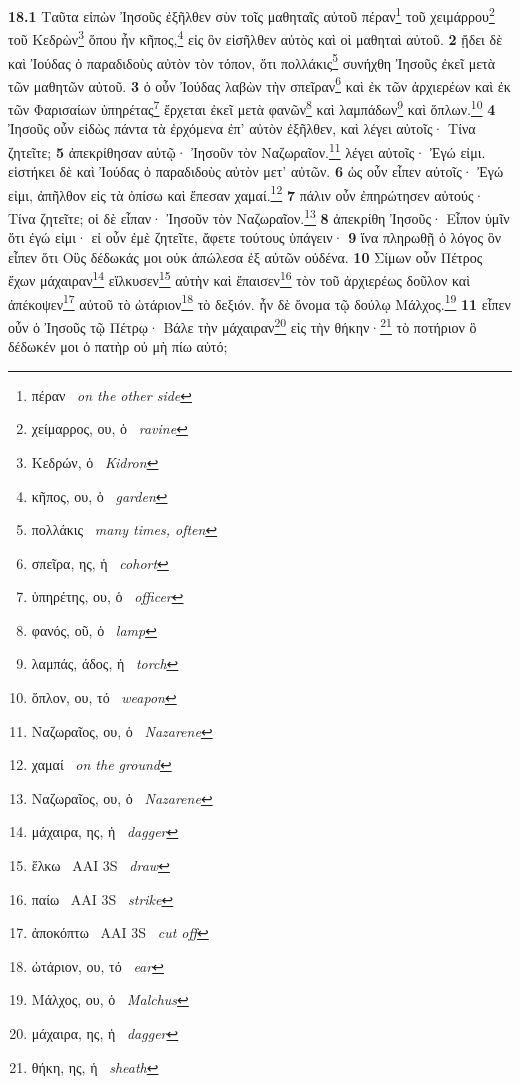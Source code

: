 \documentclass[a4paper,12pt]{article}
\begin{document}
\textbf{\Large 18.1}
Ταῦτα
εἰπὼν
Ἰησοῦς
ἐξῆλθεν
σὺν
τοῖς
μαθηταῖς
αὐτοῦ
πέραν\footnote{πέραν \textendash\ \textit{on the other side}}
τοῦ
χειμάρρου\footnote{χείμαρρος, ου, ὁ \textendash\ \textit{ravine}}
τοῦ
Κεδρὼν\footnote{Κεδρών, ὁ \textendash\ \textit{Kidron}}
ὅπου
ἦν
κῆπος,\footnote{κῆπος, ου, ὁ \textendash\ \textit{garden}}
εἰς
ὃν
εἰσῆλθεν
αὐτὸς
καὶ
οἱ
μαθηταὶ
αὐτοῦ.
\textbf{2}
ᾔδει
δὲ
καὶ
Ἰούδας
ὁ
παραδιδοὺς
αὐτὸν
τὸν
τόπον,
ὅτι
πολλάκις\footnote{πολλάκις \textendash\ \textit{many times, often}}
συνήχθη
Ἰησοῦς
ἐκεῖ
μετὰ
τῶν
μαθητῶν
αὐτοῦ.
\textbf{3}
ὁ
οὖν
Ἰούδας
λαβὼν
τὴν
σπεῖραν\footnote{σπεῖρα, ης, ἡ \textendash\ \textit{cohort}}
καὶ
ἐκ
τῶν
ἀρχιερέων
καὶ
ἐκ
τῶν
Φαρισαίων
ὑπηρέτας\footnote{ὑπηρέτης, ου, ὁ \textendash\ \textit{officer}}
ἔρχεται
ἐκεῖ
μετὰ
φανῶν\footnote{φανός, οῦ, ὁ \textendash\ \textit{lamp}}
καὶ
λαμπάδων\footnote{λαμπάς, άδος, ἡ \textendash\ \textit{torch}}
καὶ
ὅπλων.\footnote{ὅπλον, ου, τό \textendash\ \textit{weapon}}
\textbf{4}
Ἰησοῦς
οὖν
εἰδὼς
πάντα
τὰ
ἐρχόμενα
ἐπ’
αὐτὸν
ἐξῆλθεν,
καὶ
λέγει
αὐτοῖς·
Τίνα
ζητεῖτε;
\textbf{5}
ἀπεκρίθησαν
αὐτῷ·
Ἰησοῦν
τὸν
Ναζωραῖον.\footnote{Ναζωραῖος, ου, ὁ \textendash\ \textit{Nazarene}}
λέγει
αὐτοῖς·
Ἐγώ
εἰμι.
εἱστήκει
δὲ
καὶ
Ἰούδας
ὁ
παραδιδοὺς
αὐτὸν
μετ’
αὐτῶν.
\textbf{6}
ὡς
οὖν
εἶπεν
αὐτοῖς·
Ἐγώ
εἰμι,
ἀπῆλθον
εἰς
τὰ
ὀπίσω
καὶ
ἔπεσαν
χαμαί.\footnote{χαμαί \textendash\ \textit{on the ground}}
\textbf{7}
πάλιν
οὖν
ἐπηρώτησεν
αὐτούς·
Τίνα
ζητεῖτε;
οἱ
δὲ
εἶπαν·
Ἰησοῦν
τὸν
Ναζωραῖον.\footnote{Ναζωραῖος, ου, ὁ \textendash\ \textit{Nazarene}}
\textbf{8}
ἀπεκρίθη
Ἰησοῦς·
Εἶπον
ὑμῖν
ὅτι
ἐγώ
εἰμι·
εἰ
οὖν
ἐμὲ
ζητεῖτε,
ἄφετε
τούτους
ὑπάγειν·
\textbf{9}
ἵνα
πληρωθῇ
ὁ
λόγος
ὃν
εἶπεν
ὅτι
Οὓς
δέδωκάς
μοι
οὐκ
ἀπώλεσα
ἐξ
αὐτῶν
οὐδένα.
\textbf{10}
Σίμων
οὖν
Πέτρος
ἔχων
μάχαιραν\footnote{μάχαιρα, ης, ἡ \textendash\ \textit{dagger}}
εἵλκυσεν\footnote{ἕλκω \textendash\ AAI 3S \textendash\ \textit{draw}}
αὐτὴν
καὶ
ἔπαισεν\footnote{παίω \textendash\ AAI 3S \textendash\ \textit{strike}}
τὸν
τοῦ
ἀρχιερέως
δοῦλον
καὶ
ἀπέκοψεν\footnote{ἀποκόπτω \textendash\ AAI 3S \textendash\ \textit{cut off}}
αὐτοῦ
τὸ
ὠτάριον\footnote{ὠτάριον, ου, τό \textendash\ \textit{ear}}
τὸ
δεξιόν.
ἦν
δὲ
ὄνομα
τῷ
δούλῳ
Μάλχος.\footnote{Μάλχος, ου, ὁ \textendash\ \textit{Malchus}}
\textbf{11}
εἶπεν
οὖν
ὁ
Ἰησοῦς
τῷ
Πέτρῳ·
Βάλε
τὴν
μάχαιραν\footnote{μάχαιρα, ης, ἡ \textendash\ \textit{dagger}}
εἰς
τὴν
θήκην·\footnote{θήκη, ης, ἡ \textendash\ \textit{sheath}}
τὸ
ποτήριον
ὃ
δέδωκέν
μοι
ὁ
πατὴρ
οὐ
μὴ
πίω
αὐτό;
\end{document}
